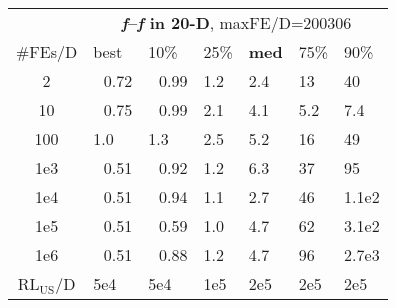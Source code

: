 \begin{tabular}{c|llllll}
 & \multicolumn{6}{|c}{\textbf{\textit{f}\raisebox{-0.35ex}{1}--\textit{f}\raisebox{-0.35ex}{24} in 20-D}, maxFE/D=200306}\\
\#FEs/D & best & 10\% & 25\% & \textbf{med} & 75\% & 90\%\\
2 & ~\,0.72 & ~\,0.99 & \hspace*{1ex}1.2 & \hspace*{1ex}2.4 & 13 & 40\\
10 & ~\,0.75 & ~\,0.99 & \hspace*{1ex}2.1 & \hspace*{1ex}4.1 & \hspace*{1ex}5.2 & \hspace*{1ex}7.4\\
100 & \hspace*{1ex}1.0 & \hspace*{1ex}1.3 & \hspace*{1ex}2.5 & \hspace*{1ex}5.2 & 16 & 49\\
1e3 & ~\,0.51 & ~\,0.92 & \hspace*{1ex}1.2 & \hspace*{1ex}6.3 & 37 & 95\\
1e4 & ~\,0.51 & ~\,0.94 & \hspace*{1ex}1.1 & \hspace*{1ex}2.7 & 46 & 1.1e2\\
1e5 & ~\,0.51 & ~\,0.59 & \hspace*{1ex}1.0 & \hspace*{1ex}4.7 & 62 & 3.1e2\\
1e6 & ~\,0.51 & ~\,0.88 & \hspace*{1ex}1.2 & \hspace*{1ex}4.7 & 96 & 2.7e3\\
$\text{RL}_{\text{US}}$/D & 5e4 & 5e4 & 1e5 & 2e5 & 2e5 & 2e5
\end{tabular}
